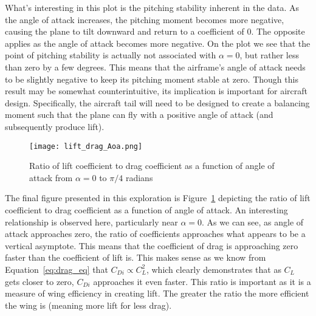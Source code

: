 \documentclass{article}
\begin{document}
What's interesting in this plot is the pitching stability inherent in the data. As the angle of attack increases, the pitching moment becomes more negative, causing the plane to tilt downward and return to a coefficient of 0. The opposite applies as the angle of attack becomes more negative.
On the plot we see that the point of pitching stability is actually not associated with $\alpha = 0$, but rather less than zero by a few degrees. This means that the airframe's angle of attack needs to be slightly negative to keep its pitching moment stable at zero.
Though this result may be somewhat counterintuitive, its implication is important for aircraft design. Specifically, the aircraft tail will need to be designed to create a balancing moment such that the plane can fly with a positive angle of attack (and subsequently produce lift).

\begin{figure}[H]
    \centering
    \texttt{[image: lift\_drag\_Aoa.png]}
    \caption{Ratio of lift coefficient to drag coefficient as a function of angle of attack from $\alpha = 0$ to $\pi/4$ radians}\label{fig:lift_drag_Aoa}
\end{figure}

The final figure presented in this exploration is Figure~\ref{fig:lift_drag_Aoa} depicting the ratio of lift coefficient to drag coefficient as a function of angle of attack.
An interesting relationship is observed here, particularly near $\alpha = 0$. As we can see, as angle of attack approaches zero, the ratio of coefficients approaches what appears to be a vertical asymptote. This means that the
coefficient of drag is approaching zero faster than the coefficient of lift is. This makes sense as we know from Equation~\eqref{eq:drag_eq} that $C_{Di} \propto C_L^2$, which clearly demonstrates that as $C_L$ gets closer to zero, $C_{Di}$ approaches it even faster.
This ratio is important as it is a measure of wing efficiency in creating lift. The greater the ratio the more efficient the wing is (meaning more lift for less drag). 
\end{document}
